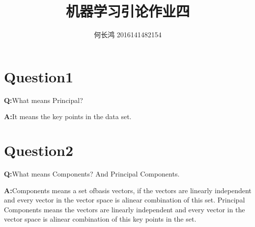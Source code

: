 \documentclass{xcumcmart}
\title{机器学习引论作业四}
\author{何长鸿 2016141482154}
\begin{document}
\renewcommand\arraystretch{2}
\maketitle
\section{Question1}
\textbf{Q:}What means Principal?\\
\par \textbf{A:}It means the key points in the data set.

\section{Question2}
\textbf{Q:}What means Components? And Principal Components.\\
\par \textbf{A:}Components means a set ofbasis vectors, if the vectors are linearly independent and every vector in the vector space is alinear combination of this set. Principal Components means the vectors are linearly independent and every vector in the vector space is alinear combination of this key points in the set.
\end{document}
